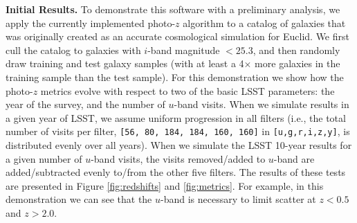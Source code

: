 \textbf{Initial Results.} To demonstrate this software with a preliminary analysis, we apply the currently implemented photo-$z$ algorithm to a catalog of galaxies that was originally created as an accurate cosmological simulation for Euclid. We first cull the catalog to galaxies with $i$-band magnitude $<25.3$, and then randomly draw training and test galaxy samples (with at least a 4$\times$ more galaxies in the training sample than the test sample). For this demonstration we show how the photo-$z$ metrics evolve with respect to two of the basic LSST parameters: the year of the survey, and the number of $u$-band visits. When we simulate results in a given year of LSST, we assume uniform progression in all filters (i.e., the total number of visits per filter, \texttt{[56, 80, 184, 184, 160, 160]} in \texttt{[u,g,r,i,z,y]}, is distributed evenly over all years). When we simulate the LSST 10-year results for a given number of $u$-band visits, the visits removed/added to $u$-band are added/subtracted evenly to/from the other five filters. The results of these tests are presented in Figure \ref{fig:redshifts} and \ref{fig:metrics}. For example, in this demonstration we can see that the $u$-band is necessary to limit scatter at $z<0.5$ and $z>2.0$.

